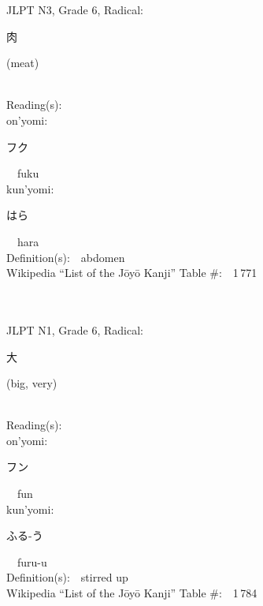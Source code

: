 \begin{multicols}{2}
{JLPT N3, Grade 6, Radical:\ \ {\begin{CJK}{UTF8}{min} 肉 \end{CJK}} (meat) } \\
Reading(s):\ \ \\
{\hspace*{1em}}on'yomi:\ \ \\
{\hspace*{2em}}{\begin{CJK}{UTF8}{min} フク \end{CJK}}\ \ fuku\ \ \\
{\hspace*{1em}}kun'yomi:\ \ \\
{\hspace*{2em}}{\begin{CJK}{UTF8}{min} はら \end{CJK}}\ \ hara\ \ \\
Definition(s):\ \ abdomen \\
Wikipedia ``List of the J\=oy\=o Kanji'' Table \#:\ \ 1\,771 \\
\ \ \\
{\fontsize{34pt}{40pt}  }\ \ \\  %
{JLPT N1, Grade 6, Radical:\ \ {\begin{CJK}{UTF8}{min} 大 \end{CJK}} (big, very) } \\
Reading(s):\ \ \\
{\hspace*{1em}}on'yomi:\ \ \\
{\hspace*{2em}}{\begin{CJK}{UTF8}{min} フン \end{CJK}}\ \ fun\ \ \\
{\hspace*{1em}}kun'yomi:\ \ \\
{\hspace*{2em}}{\begin{CJK}{UTF8}{min} ふる-う \end{CJK}}\ \ furu-u\ \ \\
Definition(s):\ \ stirred up \\
Wikipedia ``List of the J\=oy\=o Kanji'' Table \#:\ \ 1\,784 \\
\ \ \\

\end{multicols}
